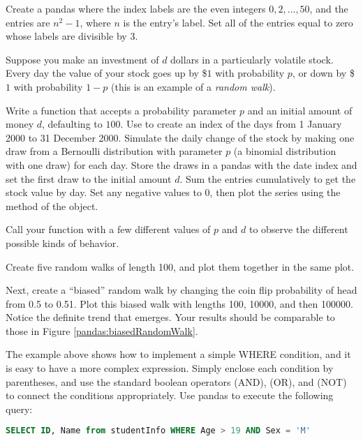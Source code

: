 
Create a pandas  where the index labels are the even integers $0,2,\ldots,50$, and the entries are $n^2 - 1$, where $n$ is the entry's label.
Set all of the entries equal to zero whose labels are divisible by $3$.

Suppose you make an investment of $d$ dollars in a particularly volatile stock.
Every day the value of your stock goes up by \$$1$ with probability $p$, or down by \$$1$ with probability $1-p$ (this is an example of a \emph{random walk}).

Write a function that accepts a probability parameter $p$ and an initial amount of money $d$, defaulting to $100$.
Use  to create an index of the days from 1 January 2000 to 31 December 2000.
Simulate the daily change of the stock by making one draw from a Bernoulli distribution with parameter $p$ (a binomial distribution with one draw) for each day.
Store the draws in a pandas  with the date index and set the first draw to the initial amount $d$.
Sum the entries cumulatively to get the stock value by day.
Set any negative values to $0$, then plot the series using the  method of the  object.

Call your function with a few different values of $p$ and $d$ to observe the different possible kinds of behavior.
\label{prob:pandas-random-walk}

Create five random walks of length 100, and plot them together in the same plot.

Next, create a ``biased'' random walk by changing the coin flip probability of head from 0.5 to 0.51.
Plot this biased walk with lengths 100, 10000, and then 100000.
Notice the definite trend that emerges.
Your results should be comparable to those in Figure \ref{pandas:biasedRandomWalk}.

The example above shows how to implement a simple WHERE condition, and it is easy
to have a more complex expression.
Simply enclose each condition by parentheses,
and use the standard boolean operators \li{\&} (AND), \li{\|} (OR), and \li{\~} (NOT) to
connect the conditions appropriately.
Use pandas to execute the following query:
\begin{lstlisting}[language=SQL]
SELECT ID, Name from studentInfo WHERE Age > 19 AND Sex = 'M'
\end{lstlisting}

